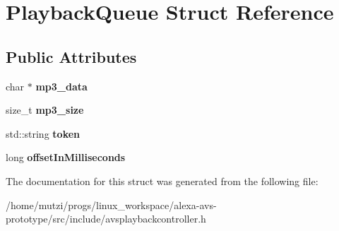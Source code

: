 \hypertarget{structPlaybackQueue}{}\section{Playback\+Queue Struct Reference}
\label{structPlaybackQueue}
\subsection*{Public Attributes}
\begin{DoxyCompactItemize}
\item 
\mbox{\label{structPlaybackQueue_a5d5095ae9e62e6c38430841bf040dac7}} 
char $\ast$ {\bfseries mp3\+\_\+data}
\item 
\mbox{\label{structPlaybackQueue_a1c65f5c767229a130f59f6e1bca5dee3}} 
size\+\_\+t {\bfseries mp3\+\_\+size}
\item 
\mbox{\label{structPlaybackQueue_a9b9438f6c78ce5cf5a9f2841a944e2f1}} 
std\+::string {\bfseries token}
\item 
\mbox{\label{structPlaybackQueue_a169c296ea0dabce41d1e8f8a7afd0835}} 
long {\bfseries offset\+In\+Milliseconds}
\end{DoxyCompactItemize}


The documentation for this struct was generated from the following file\+:\begin{DoxyCompactItemize}
\item 
/home/mutzi/progs/linux\+\_\+workspace/alexa-\/avs-\/prototype/src/include/avsplaybackcontroller.\+h\end{DoxyCompactItemize}
